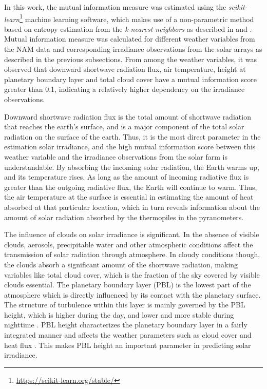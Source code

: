 \par In this work, the mutual information measure was estimated using the \textit{scikit-learn}\footnote{\url{https://scikit-learn.org/stable/}} machine learning software, which makes use of a non-parametric method based on entropy estimation from the \textit{k-nearest neighbors} as described in \cite{feature_selection_mi} and \cite{feature_selection_mi2}. Mutual information measure was calculated for different weather variables from the NAM data and corresponding irradiance observations from the solar arrays as described in the previous subsections. From among the weather variables, it was observed that downward shortwave radiation flux, air temperature, height at planetary boundary layer and total cloud cover have a mutual information score greater than 0.1, indicating a relatively higher dependency on the irradiance observations.

\par Downward shortwave radiation flux is the total amount of shortwave radiation that reaches the earth's surface, and is a major component of the total solar radiation on the surface of the earth. Thus, it is the most direct parameter in the estimation solar irradiance, and the high mutual information score between this weather variable and the irradiance observations from the solar farm is understandable. By absorbing the incoming solar radiation, the Earth warms up, and its temperature rises. As long as the amount of incoming radiative flux is greater than the outgoing radiative flux, the Earth will continue to warm. Thus, the air temperature at the surface is essential in estimating the amount of heat absorbed at that particular location, which in turn reveals information about the amount of solar radiation absorbed by the thermopiles in the pyranometers. 

\par The influence of clouds on solar irradiance is significant. In the absence of visible clouds, aerosols, precipitable water and other atmospheric conditions affect the transmission of solar radiation through atmosphere. In cloudy conditions though, the clouds absorb a significant amount of the shortwave radiation, making variables like total cloud cover, which is the fraction of the sky covered by visible clouds essential. The planetary boundary layer (PBL) is the lowest part of the atmosphere which is directly influenced by its contact with the planetary surface. The structure of turbulence within this layer is mainly governed by the PBL height, which is higher during the day, and lower and more stable during nighttime \cite{feature_selection_pbl1}. PBL height characterizes the planetary boundary layer in a fairly integrated manner and affects the weather parameters such as cloud cover and heat flux \cite{feature_selection_pbl2}. This makes PBL height an important parameter in predicting solar irradiance.

